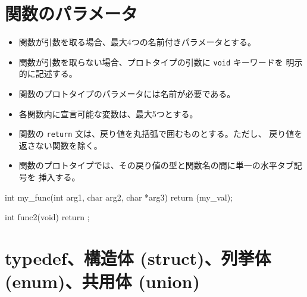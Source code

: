 \documentclass{42-ja}
\begin{document}
    \section{関数のパラメータ}

        \begin{itemize}

            \item 関数が引数を取る場合、最大4つの名前付きパラメータとする。

            \item 関数が引数を取らない場合、プロトタイプの引数に \texttt{void} キーワードを
              明示的に記述する。

            \item 関数のプロトタイプのパラメータには名前が必要である。

            \item 各関数内に宣言可能な変数は、最大5つとする。

            \item 関数の \texttt{return} 文は、戻り値を丸括弧で囲むものとする。ただし、
              戻り値を返さない関数を除く。

            \item 関数のプロトタイプでは、その戻り値の型と関数名の間に単一の水平タブ記号を
              挿入する。

        \end{itemize}

\vspace{1cm}

            \begin{42ccode}
int my_func(int arg1, char arg2, char *arg3)
{
    return (my_val);
}

int func2(void)
{
    return ;
}
            \end{42ccode}

        \newpage


\section{typedef、構造体 (struct)、列挙体 (enum)、共用体 (union)}
\end{document}
